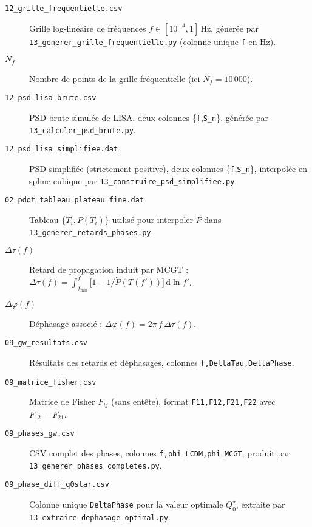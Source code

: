 \begin{description}
  \item[\texttt{12\_grille\_frequentielle.csv}]
    Grille log‐linéaire de fréquences $f\in[10^{-4},1]\,$Hz, générée par \texttt{13\_generer\_grille\_frequentielle.py} (colonne unique \texttt{f} en Hz).

  \item[$N_{f}$]
    Nombre de points de la grille fréquentielle (ici $N_{f}=10\,000$).

  \item[\texttt{12\_psd\_lisa\_brute.csv}]
    PSD brute simulée de LISA, deux colonnes \{\texttt{f},\texttt{S\_n}\}, générée par \texttt{13\_calculer\_psd\_brute.py}.

  \item[\texttt{12\_psd\_lisa\_simplifiee.dat}]
    PSD simplifiée (strictement positive), deux colonnes \{\texttt{f},\texttt{S\_n}\}, interpolée en spline cubique par \texttt{13\_construire\_psd\_simplifiee.py}.

  \item[\texttt{02\_pdot\_tableau\_plateau\_fine.dat}]
    Tableau $\{T_i,\dot P(T_i)\}$ utilisé pour interpoler $\dot P$ dans \texttt{13\_generer\_retards\_phases.py}.

  \item[$\Delta\tau(f)$]
    Retard de propagation induit par MCGT :
    $\displaystyle \Delta\tau(f)
      =\int_{f_{\min}}^{f}\bigl[1 - 1/\dot P(T(f'))\bigr]\,\mathrm{d}\ln f'$.

  \item[$\Delta\varphi(f)$]
    Déphasage associé :
    $\Delta\varphi(f)=2\pi\,f\,\Delta\tau(f)$.

  \item[\texttt{09\_gw\_resultats.csv}]
    Résultats des retards et déphasages, colonnes \texttt{f,DeltaTau,DeltaPhase}.

  \item[\texttt{09\_matrice\_fisher.csv}]
    Matrice de Fisher $F_{ij}$ (sans entête), format
    \texttt{F11,F12,F21,F22} avec $F_{12}=F_{21}$.

  \item[\texttt{09\_phases\_gw.csv}]
    CSV complet des phases, colonnes \texttt{f,phi\_LCDM,phi\_MCGT}, produit par \texttt{13\_generer\_phases\_completes.py}.

  \item[\texttt{09\_phase\_diff\_q0star.csv}]
    Colonne unique \texttt{DeltaPhase} pour la valeur optimale $Q_{0}^{\star}$, extraite par \texttt{13\_extraire\_dephasage\_optimal.py}.


\end{description}

